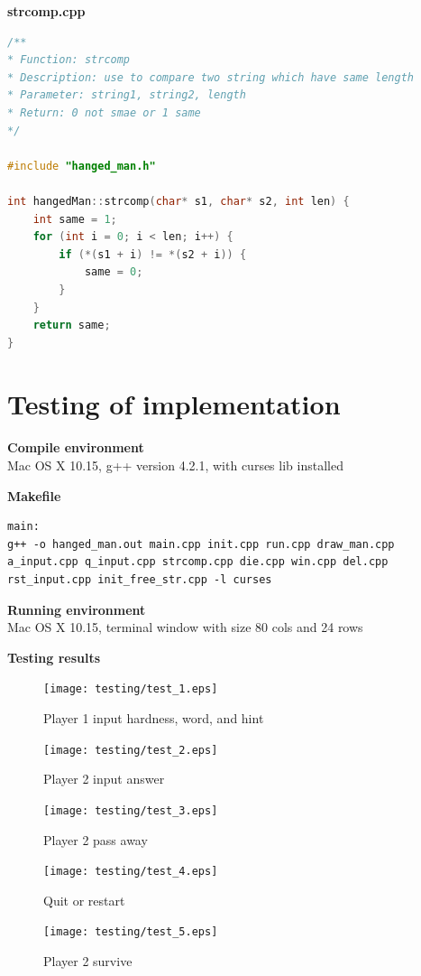\documentclass{article}
\begin{document}
        \textbf{strcomp.cpp}
        \begin{lstlisting}[language={cpp}]
/**
* Function: strcomp
* Description: use to compare two string which have same length
* Parameter: string1, string2, length
* Return: 0 not smae or 1 same
*/

#include "hanged_man.h"

int hangedMan::strcomp(char* s1, char* s2, int len) {
    int same = 1;
    for (int i = 0; i < len; i++) {
        if (*(s1 + i) != *(s2 + i)) {
            same = 0;
        }
    }
    return same;
}
        \end{lstlisting}
    
    \newpage
    \section{Testing of implementation}
        \textbf{Compile environment} \\
        Mac OS X 10.15, g++ version 4.2.1, with curses lib installed

        \textbf{Makefile} \\
        \begin{lstlisting}
main:
g++ -o hanged_man.out main.cpp init.cpp run.cpp draw_man.cpp a_input.cpp q_input.cpp strcomp.cpp die.cpp win.cpp del.cpp rst_input.cpp init_free_str.cpp -l curses
        \end{lstlisting}

        \textbf{Running environment} \\
        Mac OS X 10.15, terminal window with size 80 cols and 24 rows

        \textbf{Testing results}
        \begin{figure}[htbp]
            \centering
            \texttt{[image: testing/test\_1.eps]}
            \caption{Player 1 input hardness, word, and hint}
            \label{}
        \end{figure}

        \begin{figure}[htbp]
            \centering
            \texttt{[image: testing/test\_2.eps]}
            \caption{Player 2 input answer}
            \label{}
        \end{figure}

        \begin{figure}[htbp]
            \centering
            \texttt{[image: testing/test\_3.eps]}
            \caption{Player 2 pass away}
            \label{}
        \end{figure}

        \begin{figure}[htbp]
            \centering
            \texttt{[image: testing/test\_4.eps]}
            \caption{Quit or restart}
            \label{}
        \end{figure}

        \begin{figure}[htbp]
            \centering
            \texttt{[image: testing/test\_5.eps]}
            \caption{Player 2 survive}
            \label{}
        \end{figure}
\end{document}
